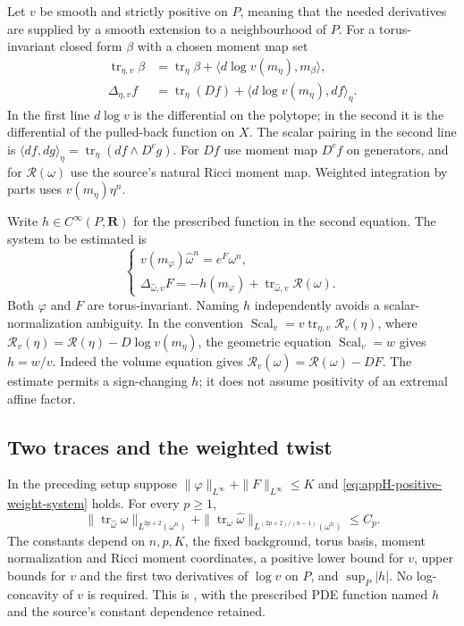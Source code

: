 Let $v$ be smooth and strictly positive on $P$, meaning that the needed
derivatives are supplied by a smooth extension to a neighbourhood of $P$.
For a torus-invariant closed form $\beta$ with a chosen moment map set
\[
\begin{aligned}
 \operatorname{tr}_{\eta,v}\beta
   &=\operatorname{tr}_\eta\beta+
       \langle d\log v(m_\eta),m_\beta\rangle,\\
 \Delta_{\eta,v}f
   &=\operatorname{tr}_\eta(Df)+
       \langle d\log v(m_\eta),df\rangle_\eta.
\end{aligned}
\tag{H.112}\label{eq:appH-weighted-source-operators}
\]
In the first line $d\log v$ is the differential on the polytope;
in the second it is the differential of the pulled-back function on $X$.
The scalar pairing in the second line is
$\langle df,dg\rangle_\eta=\operatorname{tr}_\eta(df\wedge D^cg)$.
For $Df$ use moment map $D^cf$ on generators, and for
$\mathcal R(\omega)$ use the source's natural Ricci moment map.
Weighted integration by parts uses $v(m_\eta)\eta^n$.

Write $h\in C^\infty(P,\mathbf R)$ for the prescribed function in
the second equation. The system to be estimated is
\[
\begin{cases}
 v(m_\varphi)\widehat\omega^n=e^F\omega^n,\\
 \Delta_{\widehat\omega,v}F
       =-h(m_\varphi)+
          \operatorname{tr}_{\widehat\omega,v}\mathcal R(\omega).
\end{cases}
\tag{H.113}\label{eq:appH-positive-weight-system}
\]
Both $\varphi$ and $F$ are torus-invariant. Naming $h$ independently
avoids a scalar-normalization ambiguity. In the convention
$\operatorname{Scal}_v=v\operatorname{tr}_{\eta,v}\mathcal R_v(\eta)$,
where $\mathcal R_v(\eta)=\mathcal R(\eta)-D\log v(m_\eta)$,
the geometric equation $\operatorname{Scal}_v=w$ gives $h=w/v$.
Indeed the volume equation gives
$\mathcal R_v(\widehat\omega)=\mathcal R(\omega)-DF$.
The estimate permits a sign-changing $h$; it does not assume positivity
of an extremal affine factor.

\subsection{Two traces and the weighted twist}

\begin{theorem}\label{thm:appH-positive-weight-traces}
In the preceding setup suppose
$\|\varphi\|_{L^\infty}+\|F\|_{L^\infty}\leq K$ and
\eqref{eq:appH-positive-weight-system} holds. For every $p\geq1$,
\[
 \|\operatorname{tr}_{\widehat\omega}\omega\|_{L^{2p+2}(\omega^n)}
 +\|\operatorname{tr}_\omega\widehat\omega\|
       _{L^{(2p+2)/(n-1)}(\omega^n)}\leq C_p.
 \tag{H.114}\label{eq:appH-positive-weight-trace-bounds}
\]
The constants depend on $n,p,K$, the fixed background, torus basis,
moment normalization and Ricci moment coordinates, a positive lower
bound for $v$, upper bounds for $v$ and the first two derivatives of
$\log v$ on $P$, and $\sup_P|h|$.
No log-concavity of $v$ is required. This is
\cite[Theorem~2.1]{JubertPan26PositiveWeightsV1}, with the prescribed
PDE function named $h$ and the source's constant dependence retained.
\end{theorem}

